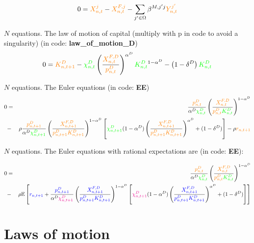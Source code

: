 \documentclass[12pt, bibtotoc, tablecaptionabove, figurecaptionabove, fleqn]{article}
\newcommand{\cl}[1]{{\color{orange}{#1}}}
\newcommand{\st}[1]{{\color{green}{#1}}}
\newcommand{\stnext}[1]{{\color{magenta}{#1}}}
\newcommand{\clnext}[1]{{\color{blue}{#1}}}
\begin{document}
{\begin{equation}
0 = \cl{X_{n, t}^{j}} - \cl{X_{n, t}^{F, j}} - \sum_{j^{\prime} \in \Omega} \beta^{M, j^{\prime} j} \cl{Y_{n, t}^{j^{\prime}}}
\end{equation}

\noindent $N$ equations. The law of motion of capital (multiply with p in code to avoid a singularity) (in code: {\bf{law\_of\_motion\_D}}) 
\begin{equation}
0 = \cl{K^D_{n,t+1}} - \st{\chi^D_{n,t}} \left( \frac{\cl{X_{n,t}^{F,D}}}{\cl{p_{n,t}^D}} \right)^{\alpha^D} \st{K^D_{n,t}}^{1-\alpha^D} - \left(1 - \delta^D\right) \st{K^D_{n,t}}
\end{equation}

\noindent $N$ equations. The Euler equations (in code: {\bf{EE}})
\begin{eqnarray}
0 &=& \frac{\cl{p_{n, t}^{D}}}{\alpha^D \st{\chi^D_{n, t}}}\left(\frac{\cl{X_{n, t}^{F,D}}}{\cl{p_{n, t}^{D}} \st{K^D_{n, t}}}\right)^{1-\alpha^D} \\
&-& \rho \frac{\cl{p_{n, t+1}^{D}}}{\alpha^D \st{\chi^D_{n, t+1}}}\left(\frac{\cl{X_{n, t+1}^{F,D}}}{\cl{p_{n, t+1}^{D}} \cl{K^D_{n, t+1}}}\right)^{1-\alpha^D}\left[\st{\chi^D_{n, t+1}}(1-\alpha^D)\left(\frac{\cl{X_{n, t+1}^{F,D}}}{\cl{p_{n, t+1}^{D}} \cl{K^D_{n, t+1}}}\right)^{\alpha^D}+(1-\delta^D)\right]-\rho \cl{r_{n, t+1}}\nonumber
\end{eqnarray}

\noindent $N$ equations. The Euler equations with rational expectations are (in code: {\bf{EE}}):

\begin{eqnarray}
	0 &=& \frac{\cl{p_{n, t}^{D}}}{\alpha^D \st{\chi^D_{n, t}}}\left(\frac{\cl{X_{n, t}^{F,D}}}{\cl{p_{n, t}^{D}} \st{K^D_{n, t}}}\right)^{1-\alpha^D} \\
	&-& \rho \mathbb{E}\left[\clnext{r_{n, t+1}} + \frac{\clnext{p_{n, t+1}^{D}}}{\alpha^D \stnext{\chi^D_{n, t+1}}}\left(\frac{\clnext{X_{n, t+1}^{F,D}}}{\clnext{p_{n, t+1}^{D}} \clnext{K^D_{n, t+1}}}\right)^{1-\alpha^D}\left[\stnext{\chi^D_{n, t+1}}(1-\alpha^D)\left(\frac{\clnext{X_{n, t+1}^{F,D}}}{\clnext{p_{n, t+1}^{D}} \clnext{K^D_{n, t+1}}}\right)^{\alpha^D}+(1-\delta^D)\right]\right]\nonumber 
\end{eqnarray}



\section{Laws of motion}

}
\end{document}
